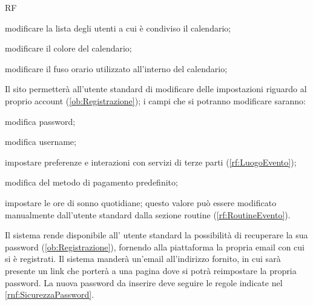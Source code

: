 \begin{listaPersonale}{RF}
\begin{listaPersonale2}[RF]{}
		 modificare la lista degli utenti a cui è condiviso il calendario;

		 modificare il colore del calendario;

		 modificare il fuso orario utilizzato all'interno del calendario;
	\end{listaPersonale2}

	 Il sito permetterà all'utente standard di modificare delle impostazioni riguardo al proprio account (\ref{ob:Registrazione}); i campi che si potranno modificare saranno:
	\begin{listaPersonale2}[RF]{}
		 modifica password;

		 modifica username;

		 impostare preferenze e interazioni con servizi di terze parti (\ref{rf:LuogoEvento});

		 modifica del metodo di pagamento predefinito;

		 impostare le ore di sonno quotidiane; questo valore può essere modificato manualmente dall'utente standard dalla sezione routine (\ref{rf:RoutineEvento}).
	\end{listaPersonale2}

	        Il sistema rende disponibile all' utente standard la possibilità di recuperare la sua password (\ref{ob:Registrazione}), fornendo alla piattaforma la propria email con cui si è registrati. Il sistema manderà un'email all'indirizzo fornito, in cui sarà presente un link che porterà a una pagina dove si potrà reimpostare la propria password. La nuova password da inserire deve seguire le regole indicate nel  \ref{rnf:SicurezzaPassword}. %
\end{listaPersonale}